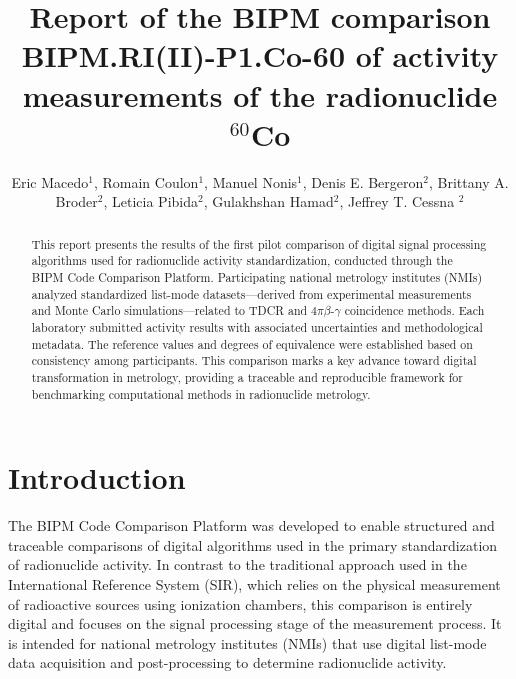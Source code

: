 \documentclass[12pt]{iopart}
\begin{document}
\title[Draft A - CONFIDENTIAL - March 2025]{Report of the BIPM comparison BIPM.RI(II)-P1.Co-60 of activity measurements of the radionuclide $^{60}$Co}

\author{Eric Macedo$^{1}$, Romain Coulon$^{1}$, Manuel Nonis$^{1}$, Denis E. Bergeron$^{2}$, Brittany A. Broder$^{2}$, Leticia Pibida$^{2}$, Gulakhshan Hamad$^{2}$, Jeffrey T. Cessna $^{2}$ }

\address{$^{1}$ Bureau International des Poids et Mesures, Pavillon de Breteuil, F-92312 S\`{e}vres Cedex, France.}
\address{$^{2}$ National Institute of Standards and Technology (NIST), 100 Bureau Drive, Mail Stop 8462 MD 20899-8462 Gaithersburg, United States.}
\vspace{10pt}

\begin{abstract}
This report presents the results of the first pilot comparison of digital signal processing algorithms used for radionuclide activity standardization, conducted through the BIPM Code Comparison Platform. Participating national metrology institutes (NMIs) analyzed standardized list-mode datasets—derived from experimental measurements and Monte Carlo simulations—related to TDCR and $4\pi\beta$-$\gamma$ coincidence methods. Each laboratory submitted activity results with associated uncertainties and methodological metadata. The reference values and degrees of equivalence were established based on consistency among participants. This comparison marks a key advance toward digital transformation in metrology, providing a traceable and reproducible framework for benchmarking computational methods in radionuclide metrology.
\end{abstract}

\section{Introduction}

The BIPM Code Comparison Platform was developed to enable structured and traceable comparisons of digital algorithms used in the primary standardization of radionuclide activity. In contrast to the traditional approach used in the International Reference System (SIR), which relies on the physical measurement of radioactive sources using ionization chambers, this comparison is entirely digital and focuses on the signal processing stage of the measurement process. It is intended for national metrology institutes (NMIs) that use digital list-mode data acquisition and post-processing to determine radionuclide activity.
\end{document}
